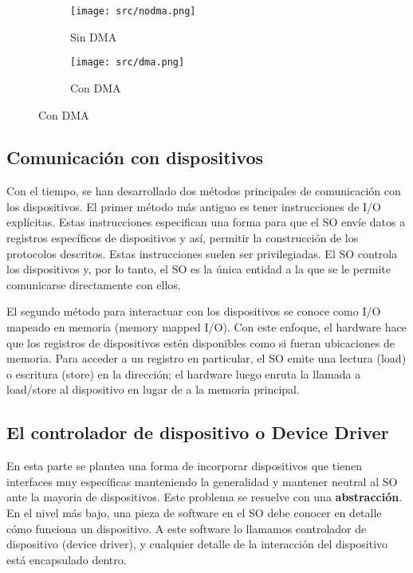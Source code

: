 \documentclass[openany]{book}
\begin{document}
\begin{figure}[h]
    \centering
    \begin{subfigure}[b]{0.47\textwidth}
        \texttt{[image: src/nodma.png]}
        \caption{Sin DMA}
    \end{subfigure}
    \begin{subfigure}[b]{0.47\textwidth}
        \texttt{[image: src/dma.png]}
        \caption{Con DMA}
    \end{subfigure}
\end{figure}   

\subsection{Comunicación con dispositivos}

Con el tiempo, se han desarrollado dos métodos principales de comunicación con los dispositivos. El primer método más antiguo es \colorbox{yellow!20}{tener instrucciones de I/O explícitas}. Estas instrucciones especifican una forma para que el SO envíe datos a registros específicos de dispositivos y así, permitir la construcción de los protocolos descritos. Estas instrucciones suelen ser privilegiadas. El SO controla los dispositivos y, por lo tanto, el SO es la única entidad a la que se le permite comunicarse directamente con ellos.

El segundo método para interactuar con los dispositivos se conoce como \colorbox{yellow!20}{I/O mapeado en memoria} (memory mapped I/O). Con este enfoque, el hardware hace que \colorbox{yellow!20}{los registros de dispositivos estén disponibles} como si fueran \colorbox{yellow!20}{ubicaciones de memoria}. Para acceder a un registro en particular, el SO emite una lectura (load) o escritura (store)  en la dirección; el hardware luego enruta la llamada a load/store al dispositivo en lugar de a la memoria principal.

\subsection{El controlador de dispositivo o Device Driver}

En esta parte se plantea una forma de incorporar dispositivos que tienen interfaces muy específicas manteniendo la \colorbox{yellow!20}{generalidad} y mantener \colorbox{yellow!20}{neutral} al SO ante la mayoria de dispositivos. Este problema se resuelve con una \textbf{abstracción}. En el nivel más bajo, una pieza de software en el SO debe conocer en detalle \colorbox{yellow!20}{cómo funciona} un dispositivo. A este software lo llamamos \colorbox{yellow!20}{controlador de dispositivo} (device driver), y cualquier detalle de la interacción del dispositivo está encapsulado dentro.
\end{document}
